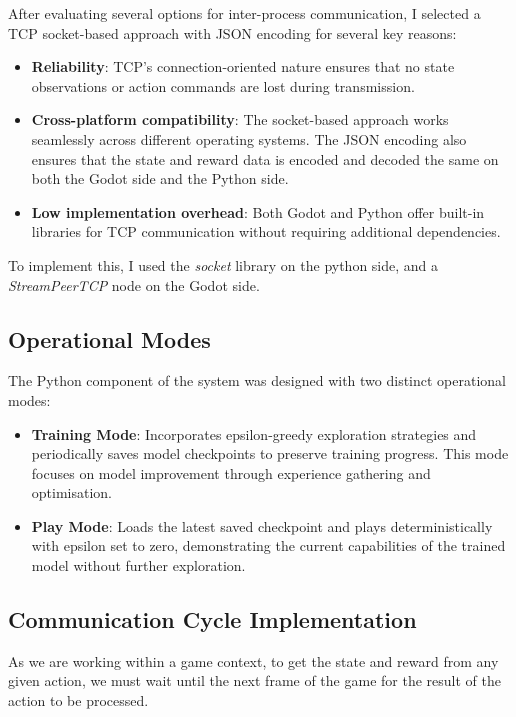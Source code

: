After evaluating several options for inter-process communication, I selected a TCP socket-based approach with JSON encoding for several key reasons:

\begin{itemize}
    \item \textbf{Reliability}: TCP's connection-oriented nature ensures that no state observations or action commands are lost during transmission.
    \item \textbf{Cross-platform compatibility}: The socket-based approach works seamlessly across different operating systems. The JSON encoding also ensures that the state and reward data is encoded and decoded the same on both the Godot side and the Python side.
    \item \textbf{Low implementation overhead}: Both Godot and Python offer built-in libraries for TCP communication without requiring additional dependencies.
\end{itemize}

To implement this, I used the \textit{socket} library on the python side, and a \textit{StreamPeerTCP} node on the Godot side.

\subsection{Operational Modes}

The Python component of the system was designed with two distinct operational modes:

\begin{itemize}
    \item \textbf{Training Mode}: Incorporates epsilon-greedy exploration strategies and periodically saves model checkpoints to preserve training progress. This mode focuses on model improvement through experience gathering and optimisation.
    \item \textbf{Play Mode}: Loads the latest saved checkpoint and plays deterministically with epsilon set to zero, demonstrating the current capabilities of the trained model without further exploration.
\end{itemize}

\subsection{Communication Cycle Implementation}

As we are working within a game context, to get the state and reward from any given action, we must wait until the next frame of the game for the result of the action to be processed. 

